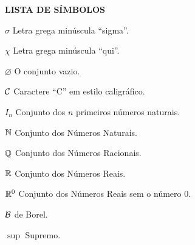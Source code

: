 \begin{center}
	\textbf{LISTA DE SÍMBOLOS}
\end{center}

\begin{description}
	\item $\sigma$ \hspace{2cm} Letra grega minúscula \enquote{sigma}.
	\item $\chi$ \hspace{2cm} Letra grega minúscula \enquote{qui}.
	\item $\varnothing$ \hspace{2cm} O conjunto vazio.
	\item $\operatorname{\mathcal{C}}$ \hspace{2cm} Caractere \enquote{C} em estilo caligráfico.
	\item $I_n$ \hspace{2cm} Conjunto dos $n$ primeiros números naturais.
	\item $\operatorname{\mathbb{N}}$ \hspace{2cm} Conjunto dos Números Naturais.
	\item $\operatorname{\mathbb{Q}}$ \hspace{2cm} Conjunto dos Números Racionais.
	\item $\mathbb{R}$ \hspace{2cm} Conjunto dos Números Reais.
	\item $\mathbb{R}^0$ \hspace{2cm} Conjunto dos Números Reais sem o número $0$.
	\item $\operatorname{\mathcal{B}}$ \hspace{2cm} \sigal de Borel.
	\item $\sup$ \hspace{2cm} Supremo.	
\end{description}
\pagebreak 